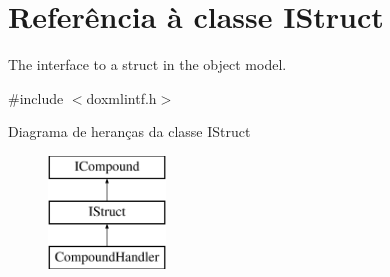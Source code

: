 \hypertarget{class_i_struct}{\section{Referência à classe I\-Struct}
\label{class_i_struct}
}


The interface to a struct in the object model.  




{\ttfamily \#include $<$doxmlintf.\-h$>$}

Diagrama de heranças da classe I\-Struct\begin{figure}[H]
\begin{center}
\leavevmode
\includegraphics[height=3.000000cm]{class_i_struct}
\end{center}
\end{figure}

